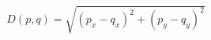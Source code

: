 \documentclass[10pt]{article}
\begin{document}
\begin{align*}D(p,q) = \sqrt{(p_x - q_x)^2 + (p_y - q_y)^2}\end{align*}
\end{document}
